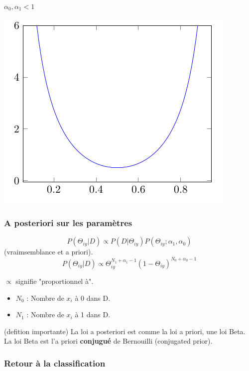 \documentclass{article}
\begin{document}
\begin{itemize}
$\alpha_0, \alpha_1 < 1$

\includegraphics[scale=0.4]{schema3.png}

\end{itemize}

\subsubsection{A posteriori sur les paramètres}

\[ P(\Theta_{iy} | D) \propto P(D | \Theta_{iy}) P(\Theta_{iy}; \alpha_1, \alpha_0) \] (vraimsemblance et a priori).
\[ P(\Theta_{iy} | D) \propto \Theta_{iy}^{N_1 + \alpha_1 - 1} (1 - \Theta_{iy})^{N_0 + \alpha_0 - 1} \]

$\propto$ signifie "proportionnel à".

\begin{itemize}
\item $N_0$ : Nombre de $x_i$ à 0 dans D.
\item $N_1$ : Nombre de $x_i$ à 1 dans D.
\end{itemize}

(defition importante)
La loi a posteriori est comme la loi a priori, une loi Beta. La loi Beta est l'a priori \textbf{conjugué} de Bernouilli (conjugated prior).

\subsubsection{Retour à la classification}
\end{document}
